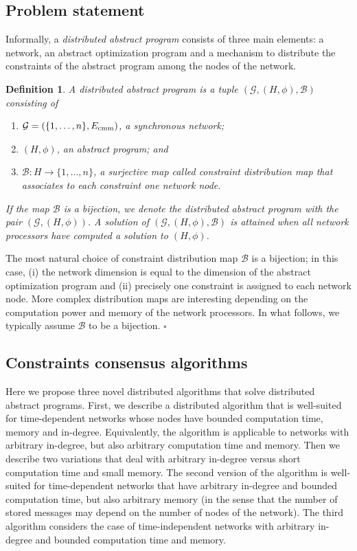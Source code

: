 \documentclass[onecolumn,journal,letterpaper]{IEEEtran}
\newcommand{\subscr}[2]{{#1}_{\textup{#2}}}
\newcommand{\map}[3]{#1: #2 \rightarrow #3}
\newcommand{\GG}{\mathcal{G}}
\newcommand{\until}[1]{\{1,\dots,#1\}}
\newcommand{\NALPmap}{\mathcal{B}}
\newtheorem{definition}[theorem]{Definition}
\newcommand\oprocendsymbol{\hbox{$\square$}}
\newcommand\oprocend{\relax\ifmmode\else\unskip\hfill\fi\oprocendsymbol}
\begin{document}
\subsection{Problem statement}
Informally, a \emph{distributed abstract program} consists of three main
elements: a network, an abstract optimization program and a mechanism to
distribute the constraints of the abstract program among the nodes of the
network.
\begin{definition}
  A distributed abstract program is a tuple $( \GG, (H, \phi),
  \NALPmap)$ consisting of
  \begin{enumerate}
  \item $\GG = (\until{n}, \subscr{E}{cmm})$, a synchronous network;
  \item $(H, \phi)$, an abstract program; and
  \item $\map{\NALPmap}{H}{\until{n}}$, a surjective map called
    \emph{constraint distribution map} that associates to each constraint
    one network node.
  \end{enumerate}
  If the map $\NALPmap$ is a bijection, we denote the distributed abstract
  program with the pair $(\GG, (H, \phi))$. A \emph{solution} of $( \GG,
  (H, \phi), \NALPmap)$ is attained when all network processors have
  computed a solution to $(H, \phi)$.
\end{definition}

\begin{remark}
  The most natural choice of constraint distribution map $\NALPmap$ is a
  bijection; in this case, (i) the network dimension is equal to the
  dimension of the abstract optimization program and (ii) precisely one
  constraint is assigned to each network node.  More complex distribution
  maps are interesting depending on the computation power and memory of the
  network processors.  In what follows, we typically assume $\NALPmap$ to
  be a bijection. \oprocend
\end{remark}



\subsection{Constraints consensus algorithms}
Here we propose three novel distributed algorithms that solve distributed
abstract programs.  First, we describe a distributed algorithm that
is well-suited for time-dependent networks whose nodes have bounded
computation time, memory and in-degree.  Equivalently, the algorithm is
applicable to networks with arbitrary in-degree, but also arbitrary
computation time and memory.
Then we describe two variations that deal with arbitrary in-degree versus
short computation time and small memory. The second version of the
algorithm is well-suited for time-dependent networks that have arbitrary
in-degree and bounded computation time, but also arbitrary memory (in the
sense that the number of stored messages may depend on the number of nodes
of the network).  The third algorithm considers the case of
time-independent networks with arbitrary in-degree and bounded computation
time and memory.
\end{document}

